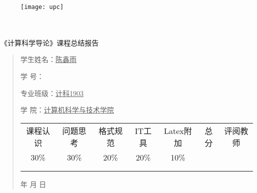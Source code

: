 \documentclass{article}
\renewcommand{\today}{\number\year 年 \number\month 月 \number\day 日}
\begin{document}
\begin{figure}
    \centering
    \texttt{[image: upc]}

    \label{figupc}
\end{figure}

	\begin{center}
		\quad \\
		\quad \\
		\heiti \fontsize{45}{17} \quad \quad \quad 
		\vskip 1.5cm
		\heiti {} 《计算科学导论》课程总结报告
	\end{center}
	\vskip 2.0cm
		
	\begin{quotation}
		\doublespacing
		
        \par\setlength\parindent{7em}
		\quad 

		学生姓名：\underline{\qquad  陈鑫雨 \qquad \qquad}

		学\hspace{0.61cm} 号：\underline{\qquad}
		
		专业班级：\underline{\qquad 计科1903 \qquad  }
		
        学\hspace{0.61cm} 院：\underline{计算机科学与技术学院}
		\vskip 2cm
		\centering
		\begin{table}[h]
            \centering 
            \begin{tabular}{|c|c|c|c|c|c|c|}
                \hline
                课程认识 & 问题思 考 & 格式规范  & IT工具  & Latex附加  & 总分 & 评阅教师 \\
                30\% & 30\% & 20\% & 20\% & 10\% &  &  \\
                \hline
                 & & & & & &\\
                & & & & & &\\
                \hline
            \end{tabular}
        \end{table}
		\vskip 2cm
		\today
	\end{quotation}

\thispagestyle{empty}
\newpage
\setcounter{page}{1}
\end{document}
